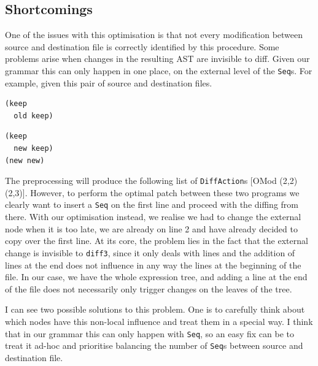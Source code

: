 \documentclass[11pt]{article}
\begin{document}
\subsection{Shortcomings}
One of the issues with this optimisation is that not every modification between 
source and destination file is correctly identified by this procedure. Some 
problems arise when changes in the resulting AST are invisible to diff. Given 
our grammar this can only happen in one place, on the external level of the 
\texttt{Seq}s. For example, given this pair of source and destination files.
\begin{lstlisting}[language=haskell]
(keep
  old keep)
\end{lstlisting}

\begin{lstlisting}[language=haskell]
(keep
  new keep)
(new new)
\end{lstlisting}

The preprocessing will produce the following list of \texttt{DiffAction}s [OMod (2,2) 
(2,3)]. However, to perform the optimal patch between these two programs we 
clearly want to insert a \texttt{Seq} on the first line and proceed with the 
diffing from there. With our optimisation instead, we realise we had to change 
the external node when it is too late, we are already on line 2 and have already 
decided to copy over the first line. 
At its core, the problem lies in the fact that the external change is invisible to 
\texttt{diff3}, since it only deals with lines and the addition of lines at the end does not influence in any way
the lines at the beginning of the file. In our case, we have the whole 
expression tree, and adding a line at the end of the file does not necessarily only trigger 
changes on the leaves of the tree.

I can see two possible solutions to this problem. One is to carefully think 
about which nodes have this non-local influence and treat them in a special way. 
I think that in our grammar this can only happen with \texttt{Seq}, so an easy 
fix can be to treat it ad-hoc and prioritise balancing the number of 
\texttt{Seq}s between source and destination file.
\end{document}
